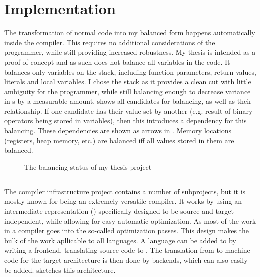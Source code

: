 \section{Implementation}
\label{pass}
The transformation of normal code into my balanced form happens automatically inside the compiler.
This requires no additional considerations of the programmer, while still providing increased robustness.
My thesis is intended as a proof of concept and as such does not balance all variables in the code.
It balances only variables on the stack, including function parameters, return values, literals and local variables.
I chose the stack as it provides a clean cut with little ambiguity for the programmer, while still balancing enough to decrease variance in \hammingw{}s by a measurable amount.
 shows all candidates for balancing, as well as their relationship.
If one candidate has their value set by another (e.g. result of binary operators being stored in variables), then this introduces a dependency for this balancing.
These dependencies are shown as arrows in .
Memory locations (registers, heap memory, etc.) are balanced iff all values stored in them are balanced.

\begin{figure}[h]
  \centering
  \caption{The balancing status of my thesis project}
  \label{fig:implementation}
\end{figure}

\subsection{\llvm{}}
\label{llvm}
The \llvm{} compiler infrastructure project\cite{lattner2010llvm} contains a number of subprojects, but it is mostly known for being an extremely versatile compiler.
It works by using an intermediate representation (\ir{}) specifically designed to be source and target independent, while allowing for easy automatic optimization.
As most of the work in a compiler goes into the so-called optimization passes.
This design makes the bulk of the work apllicable to all languages.
A language can be added to \llvm{} by writing a frontend, translating source code to \ir{}.
The translation from \ir{} to machine code for the target architecture is then done by backends, which can also easily be added.
 sketches this architecture.

